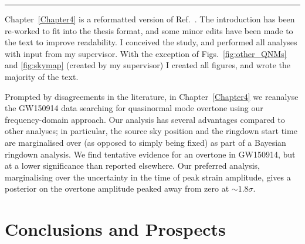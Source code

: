 \documentclass[
12pt, %
english, %
doublespacing, %
headsepline, %
]{MastersDoctoralThesis} %
\begin{document}
\begin{center}
    \rule[.5ex]{.5\textwidth}{.5pt}
\end{center}

\noindent Chapter~\ref{Chapter4} is a reformatted version of Ref.~\cite{Finch:2022ynt}. 
The introduction has been re-worked to fit into the thesis format, and some minor edits have been made to the text to improve readability. 
I conceived the study, and performed all analyses with input from my supervisor.
With the exception of Figs.~\ref{fig:other_QNMs} and \ref{fig:skymap} (created by my supervisor) I created all figures, and wrote the majority of the text.

\vspace{0.2cm}

\noindent Prompted by disagreements in the literature, in Chapter~\ref{Chapter4} we reanalyse the GW150914 data searching for quasinormal mode overtone using our frequency-domain approach.
Our analysis has several advantages compared to other analyses; in particular, the source sky position and the ringdown start time are marginalised over (as opposed to simply being fixed) as part of a Bayesian ringdown analysis. 
We find tentative evidence for an overtone in GW150914, but at a lower significance than reported elsewhere. 
Our preferred analysis, marginalising over the uncertainty in the time of peak strain amplitude, gives a posterior on the overtone amplitude peaked away from zero at $\sim 1.8 \sigma$.


\mainmatter %

\pagestyle{thesis} %



 

 


\chapter{Conclusions and Prospects}
\end{document}
